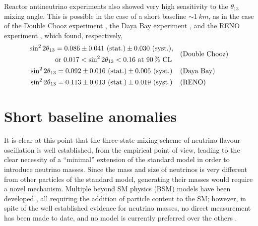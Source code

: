 Reactor antineutrino experiments also showed very high sensitivity to the $\theta_{13}$ mixing angle. This is possible in the case of a short baseline ${\sim} \SI{1}{km}$, as in the case of the Double Chooz experiment \cite{abeIndicationDisappearanceReactor2012}, the Daya Bay experiment \cite{anObservationElectronantineutrinoDisappearance2012}, and the RENO experiment \cite{kimObservationReactorElectron2012}, which found, respectively, \begin{align}
    &\begin{aligned}
        \sin^22\theta_{13} &= \mathrm{0.086 \pm 0.041\ (stat.) \pm 0.030\ (syst.)},\\
        & \text{or}\ 0.017 < \sin^22\theta_{13} < 0.16\ \text{at \SI{90}{\percent} CL}
    \end{aligned} && \text{(Double Chooz)}\\
    &\sin^22\theta_{13} = \mathrm{0.092 \pm 0.016\ (stat.) \pm 0.005\ (syst.)} && \text{(Daya Bay)}\\
    &\sin^22\theta_{13} = \mathrm{0.113 \pm 0.013\ (stat.) \pm 0.019\ (syst.)} && \text{(RENO)}
\end{align} 

\section{Short baseline anomalies}\label{sec:anomalies}

It is clear at this point that the three-state mixing scheme of neutrino flavour oscillation is well established, from the empirical point of view, leading to the clear necessity of a ``minimal'' extension of the standard model in order to introduce neutrino masses. Since the mass and size of neutrinos is very different from other particles of the standard model, generating their masses would require a novel mechanism. Multiple beyond SM physics (BSM) models have been developed \cite{navasReviewParticlePhysics2024, Arguelles:2019xgp}, all requiring the addition of particle content to the SM; however, in spite of the well established evidence for neutrino masses, no direct measurement has been made to date, and no model is currently preferred over the others \cite{navasReviewParticlePhysics2024}. 

